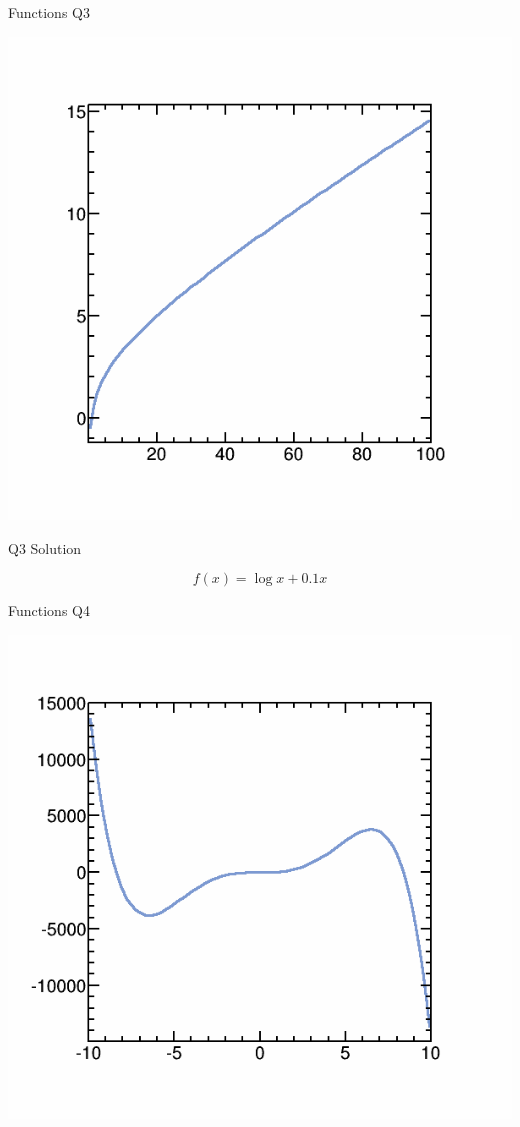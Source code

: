 \documentclass{beamer}
\begin{document}
\begin{frame}{Functions Q3}
\begin{center}
\includegraphics[scale=0.3]{pics/wk3/q3.png}
\end{center}
\end{frame}

\begin{frame}{Q3 Solution}


\[
f(x) = \log{x} + 0.1x
\]

\end{frame}

\begin{frame}{Functions Q4}
\begin{center}
\includegraphics[scale=0.3]{pics/wk3/q4.png}
\end{center}
\end{frame}
\end{document}
